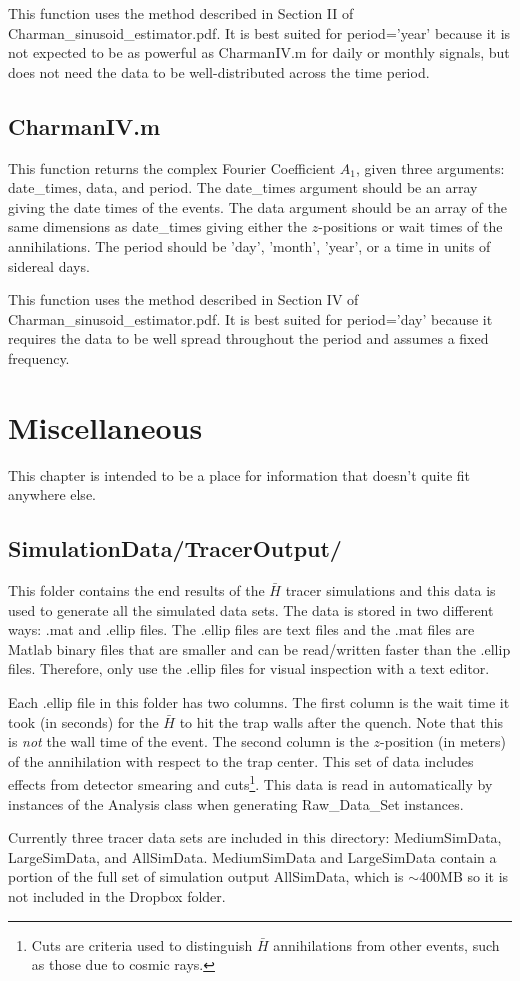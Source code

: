 \documentclass[12pt]{report}
\begin{document}
This function uses the method described in Section II of Charman\_sinusoid\_estimator.pdf.  It  is best suited for period='year' because it is not expected to be as powerful as CharmanIV.m for daily or monthly signals, but does not need the data to be well-distributed across the time period.

\section{CharmanIV.m}
This function returns the complex Fourier Coefficient $A_1$, given three arguments: date\_times, data, and period.  The date\_times argument should be an array giving the date times of the events.  The data argument should be an array of the same dimensions as date\_times giving either the $z$-positions or wait times of the annihilations.  The period should be 'day', 'month', 'year', or a time in units of sidereal days.

This function uses the method described in Section IV of Charman\_sinusoid\_estimator.pdf.  It  is best suited for period='day' because it requires the data to be well spread throughout the period and assumes a fixed frequency.





\chapter{Miscellaneous}
This chapter is intended to be a place for information that doesn't quite fit anywhere else.

\section{SimulationData/TracerOutput/}
This folder contains the end results of the $\bar{H}$ tracer simulations and this data is used to generate all the simulated data sets.  The data is stored in two different ways: .mat and .ellip files.  The .ellip files are text files and the .mat files are Matlab binary files that are smaller and can be read/written faster than the .ellip files.  Therefore, only use the .ellip files for visual inspection with a text editor.

Each .ellip file in this folder has two columns.  The first  column is the wait time it took (in seconds) for the $\bar{H}$ to hit the trap walls after the quench.  Note that this is \textit{not} the wall time of the event.  The second column is the $z$-position (in meters) of the annihilation with respect to the trap center.  This set of data includes effects from detector smearing and cuts\footnote{Cuts are criteria used to distinguish $\bar{H}$ annihilations from other events, such as those due to cosmic rays.}.  This data is read in automatically by instances of the Analysis class when generating Raw\_Data\_Set instances.

Currently three tracer data sets are included in this directory: MediumSimData, LargeSimData, and AllSimData.  MediumSimData and LargeSimData contain a portion of the full set of simulation output AllSimData, which is ${\sim}$400MB so it is not included in the Dropbox folder.
\end{document}
